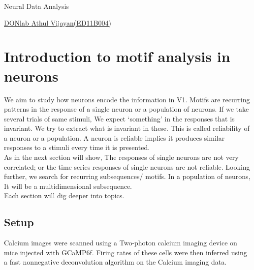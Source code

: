 \documentclass[11pt,paper=a4,answers]{exam}
\begin{document}
\noindent
\begin{minipage}[l]{.1\textwidth}%
\noindent
\end{minipage}
\hfill
\begin{minipage}[r]{.68\textwidth}%
\begin{center}
{\large \bfseries \par
\Large Neural Data Analysis \\[2pt]
\vspace{6pt}
\small   \par}
\end{center}
\end{minipage}
\begin{minipage}[l]{.195\textwidth}%
\noindent
{\footnotesize}
\end{minipage}
\par
\noindent
\uline{DONlab \hfill \normalsize\emph \hfill    Athul Vijayan(ED11B004)}\\

\tableofcontents
\newpage
\section{Introduction to motif analysis in neurons} %
\label{sec:introduction}
We aim to study how neurons encode the information in V1. Motifs are recurring patterns in the response of a single neuron or a population of neurons. If we take several trials of same stimuli, We expect `something' in the responses that is invariant. We try to extract what is invariant in these. This is called reliability of a neuron or a population. A neuron is reliable implies it produces similar responses to a stimuli every time it is presented.\\
As in the next section will show, The responses of single neurons are not very correlated; or the time series responses of single neurons are not reliable. Looking further, we search for recurring subsequences/ motifs. In a population of neurons, It will be a multidimensional subsequence.\\
Each section will dig deeper into topics.

\subsection{Setup} %
\label{sub:setup}
Calcium images were scanned using a Two-photon calcium imaging device on mice injected with GCaMP6f. Firing rates of these cells were then inferred using a fast nonnegative deconvolution algorithm on the Calcium imaging data.\\
\end{document}
